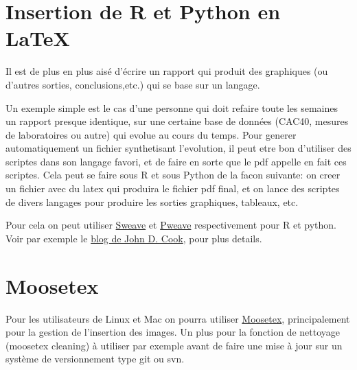 \section{Insertion de R et Python en \LaTeX{} }
Il est de plus en plus aisé d'écrire un rapport qui produit des graphiques (ou d'autres sorties, conclusions,etc.)
qui se base sur un langage. 

Un exemple simple est le cas d'une personne qui doit refaire toute les semaines un rapport presque identique,
sur une certaine base de données (CAC40, mesures de laboratoires ou autre) qui evolue au cours du temps.
Pour generer automatiquement un fichier synthetisant l'evolution, il peut etre bon d'utiliser des scriptes dans
son langage favori, et de faire en sorte que le pdf appelle en fait ces scriptes.
Cela peut se faire sous R et sous Python de la facon suivante:
on creer un fichier avec du latex qui produira le fichier pdf final, et on lance des scriptes de divers langages
pour produire les sorties graphiques, tableaux, etc.



Pour cela on peut utiliser \href{leisch.userweb.mwn.de/Sweave/}{Sweave} et 
\href{http://mpastell.com/pweave/}{Pweave} respectivement pour  R et python. Voir par exemple le 
\href{http://www.johndcook.com/blog/2012/12/20/basics-of-sweave-and-pweave/}{blog de John D. Cook},
pour plus details.



\section{Moosetex}

Pour les utilisateurs de Linux et Mac on pourra utiliser 
\href{http://www.math.u-bordeaux1.fr/~cdeledal/moosetex}{Moosetex},
principalement pour la gestion de l'insertion des images.
Un plus pour la fonction de nettoyage (moosetex cleaning) \`a utiliser par exemple
avant de faire une mise \`a jour sur un système de versionnement type git ou svn.

